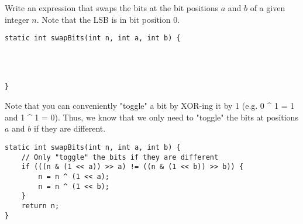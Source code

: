 
\question Write an expression that swaps the bits at the bit positions $a$ and $b$ of a given integer $n$. Note that the LSB is in bit position 0.

\ifprintanswers\else
\begin{lstlisting}
static int swapBits(int n, int a, int b) {
    
    
    
    
}
\end{lstlisting}
\fi

\begin{solution}
Note that you can conveniently "toggle" a bit by XOR-ing it by 1 (e.g. 0 ^ 1 = 1 and 1 ^ 1 = 0). Thus, we know that we only need to "toggle" the bits at positions $a$ and $b$ if they are different.
\begin{lstlisting}
static int swapBits(int n, int a, int b) {
    // Only "toggle" the bits if they are different
    if (((n & (1 << a)) >> a) != ((n & (1 << b)) >> b)) {
        n = n ^ (1 << a);
        n = n ^ (1 << b);
    }
    return n;
}
\end{lstlisting}
\end{solution}